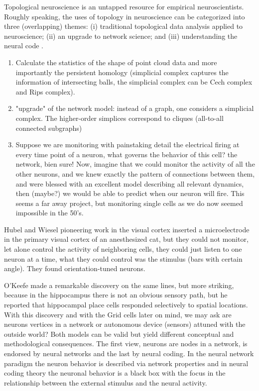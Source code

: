 \documentclass[onecollarge,runningheads]{svjour2}
\begin{document}
Topological neuroscience is an untapped resource for empirical neuroscientists.
Roughly speaking, the uses of topology in neuroscience can be categorized into three (overlapping) themes: (i) traditional topological data analysis applied to neuroscience; (ii) an upgrade to network science; and (iii) understanding the neural code \citep{curto2016can}.
\begin{enumerate}
\item  Calculate the statistics of the shape of point cloud data and more importantly the persistent homology (simplicial complex captures the information of intersecting balls, the simplicial complex can be Cech complex and Rips complex).
\item  "upgrade" of the network model: instead of a graph, one considers a simplicial complex. The higher-order simplices correspond to cliques (all-to-all connected subgraphs)
\item Suppose we are monitoring with painstaking detail the electrical firing at every time point of a neuron, what governs the behavior of this cell? the network, bien sure!  Now, imagine that we could monitor the activity of all the other neurons, and we knew exactly the pattern of connections between them, and were blessed with an excellent model describing all relevant dynamics, then (maybe?) we would be able to predict when our neuron will fire. This seems a far away project, but monitoring  single cells as we do now seemed impossible in the 50's. %

\end{enumerate}

Hubel and Wiesel pioneering work in the visual cortex inserted a microelectrode in the primary visual cortex of an anesthesized cat, but they could not monitor, let alone control the activity of neighboring cells, they could just listen to one neuron at a time, what they could control was the stimulus (bars with certain angle). They found orientation-tuned neurons.

O'Keefe made a remarkable discovery on the same lines, but more striking, because in the hippocampus there is not an obvious sensory path, but he reported that hippocampal place cells responded selectively to spatial locations.
With this discovery and with the Grid cells later on mind, we may ask are neurons vertices in a network or autonomous device (sensors) attuned with the outside world? Both models can be valid but yield different conceptual and methodological consequences. The first view, neurons are nodes in a network, is endorsed by neural networks and the last by neural coding. In the neural network paradigm the neuron behavior is described via network properties and in neural coding theory the neuronal behavior is a black box with the focus in the relationship between the external stimulus and the neural activity.
\end{document}
